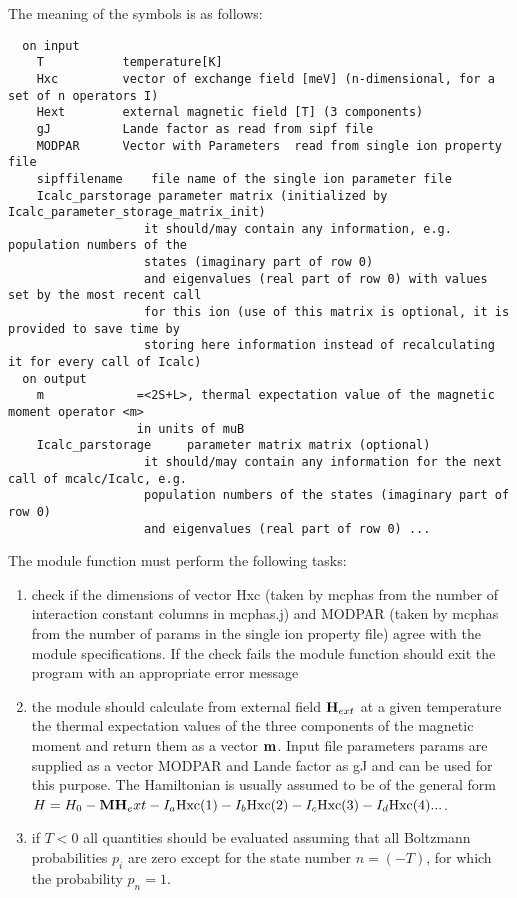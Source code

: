 The meaning of the symbols is as follows:
{\footnotesize
\begin{verbatim}
  on input
    T           temperature[K]
    Hxc         vector of exchange field [meV] (n-dimensional, for a set of n operators I)
    Hext        external magnetic field [T] (3 components)
    gJ          Lande factor as read from sipf file
    MODPAR      Vector with Parameters  read from single ion property file
    sipffilename    file name of the single ion parameter file
    Icalc_parstorage parameter matrix (initialized by Icalc_parameter_storage_matrix_init)
                   it should/may contain any information, e.g. population numbers of the
                   states (imaginary part of row 0)
                   and eigenvalues (real part of row 0) with values set by the most recent call
                   for this ion (use of this matrix is optional, it is provided to save time by
                   storing here information instead of recalculating it for every call of Icalc)
  on output    
    m             =<2S+L>, thermal expectation value of the magnetic moment operator <m> 
                  in units of muB
    Icalc_parstorage     parameter matrix matrix (optional)
                   it should/may contain any information for the next call of mcalc/Icalc, e.g.
                   population numbers of the states (imaginary part of row 0)
                   and eigenvalues (real part of row 0) ...
\end{verbatim}
}
The module function must perform the following tasks:
\begin{enumerate}
\item check if the dimensions of vector Hxc (taken by {\prg mcphas} from the number of 
interaction constant columns in {\prg mcphas.j})
 and MODPAR (taken by {\prg mcphas} from the number of params in the single ion property
file) agree with the module specifications.  If the check fails the module function should exit the
program with an appropriate error message
\item the module should calculate from external field $\mathbf H_{ext}$ at a given temperature the 
thermal expectation values of the three components of the magnetic moment
and return them as
a vector $\mathbf m$. Input file parameters params are supplied as a vector MODPAR and
Lande factor as gJ and  can be used for this purpose. The Hamiltonian
is usually assumed to be of the general form
 $H=H_0- \mathbf M \mathbf H_ext - I_a {\rm Hxc}(1) -I_b {\rm Hxc}(2) -I_c {\rm Hxc}(3) 
-I_d {\rm Hxc}(4) ...$.
\item if $T<0$ all quantities should be evaluated assuming that all Boltzmann probabilities $p_i$
 are zero except for the state number $n=(-T)$, for which the probability $p_n=1$.
\end{enumerate}

